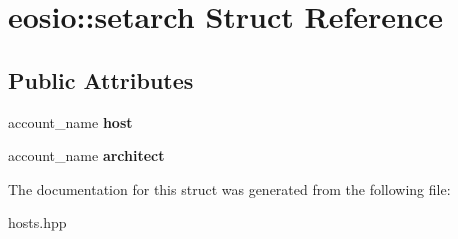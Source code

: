 \hypertarget{structeosio_1_1setarch}{}\section{eosio\+:\+:setarch Struct Reference}
\label{structeosio_1_1setarch}
\subsection*{Public Attributes}
\begin{DoxyCompactItemize}
\item 
\mbox{\label{structeosio_1_1setarch_a9f1a3cf121cfa3374eb9e56ab7c9599a}} 
account\+\_\+name {\bfseries host}
\item 
\mbox{\label{structeosio_1_1setarch_a4f15ed0af33e999d462bea80247099ab}} 
account\+\_\+name {\bfseries architect}
\end{DoxyCompactItemize}


The documentation for this struct was generated from the following file\+:\begin{DoxyCompactItemize}
\item 
hosts.\+hpp\end{DoxyCompactItemize}
